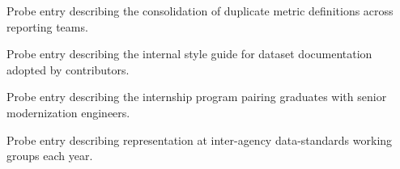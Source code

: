 \documentclass[fontsize=11pt, margin=narrow, medium=print]{careerdossier-resume}
\begin{document}
\begin{CDossierEntry}[title = {Reporting Platform Review}, organization = {Regional Data Cooperative}, location = {Kitchener, ON}, dates = {2015--2019}]
  \begin{CDossierItemize}
    \item Probe entry describing the consolidation of duplicate metric definitions across reporting teams.
    \item Probe entry describing the internal style guide for dataset documentation adopted by contributors.
    \item Probe entry describing the internship program pairing graduates with senior modernization engineers.
    \item Probe entry describing representation at inter-agency data-standards working groups each year.
  \end{CDossierItemize}
\end{CDossierEntry}
\end{document}
